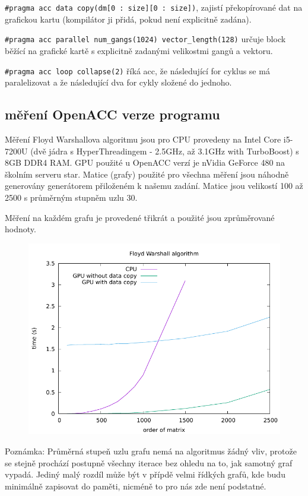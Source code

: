 \documentclass[11pt, fleqn]{article}
\begin{document}
\lstinline{#pragma acc data copy(dm[0 : size][0 : size])}, zajistí překopírované dat na grafickou kartu (kompilátor ji přidá, pokud není explicitně zadána).

\lstinline{#pragma acc parallel num_gangs(1024) vector_length(128)} určuje block běžící na grafické kartě s explicitně zadanými velikostmi gangů a vektoru.

\lstinline{#pragma acc loop collapse(2)} říká acc, že následující for cyklus se má paralelizovat a že následující dva for cykly složené do jednoho.


\subsection{měření OpenACC verze programu}

Měření Floyd Warshallova algoritmu jsou pro CPU provedeny na Intel Core i5-7200U (dvě jádra s HyperThreadingem - 2.5GHz, až 3.1GHz with TurboBoost) s 8GB DDR4 RAM. GPU použité u OpenACC verzí je nVidia GeForce 480 na školním serveru star. Matice (grafy) použité pro všechna měření jsou náhodně generovány generátorem přiloženém k našemu zadání. Matice jsou velikostí 100 až 2500 s průměrným stupněm uzlu 30.

Měření na každém grafu je provedené třikrát a použité jsou zprůměrované hodnoty.

\begin{figure}
  \centering
  \includegraphics[width=.7\linewidth]{../results/Floyd_Warshall.pdf}
  \label{fig:fw1}
\end{figure}

Poznámka: Průměrná stupeň uzlu grafu nemá na algoritmus žádný vliv, protože se stejně prochází postupně všechny iterace bez ohledu na to, jak samotný graf vypadá. Jediný malý rozdíl může být v přípdě velmi řídkých grafů, kde budu minimálně zapisovat do paměti, nicméně to pro nás zde není podstatné.
\end{document}
